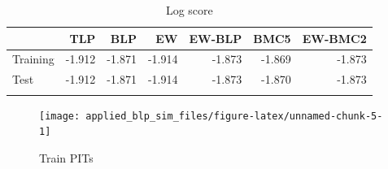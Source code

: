 \documentclass[
]{article}
\begin{document}
\begin{table}[H]
\caption{\label{tab:unnamed-chunk-4}Log score}

\centering
\fontsize{8}{10}\selectfont
\begin{tabular}[t]{lrrrrrr}
\toprule{}
  & TLP & BLP & EW & EW-BLP & BMC5 & EW-BMC2\\
\midrule{}
Training & -1.912 & -1.871 & -1.914 & -1.873 & -1.869 & -1.873\\
Test & -1.912 & -1.871 & -1.914 & -1.873 & -1.870 & -1.873\\
\bottomrule{}
\end{tabular}
\end{table}

\begin{figure}[h]

{\centering \texttt{[image: applied\_blp\_sim\_files/figure-latex/unnamed-chunk-5-1]} 

}

\caption{Train PITs}\label{fig:unnamed-chunk-5}
\end{figure}

\clearpage
\end{document}
